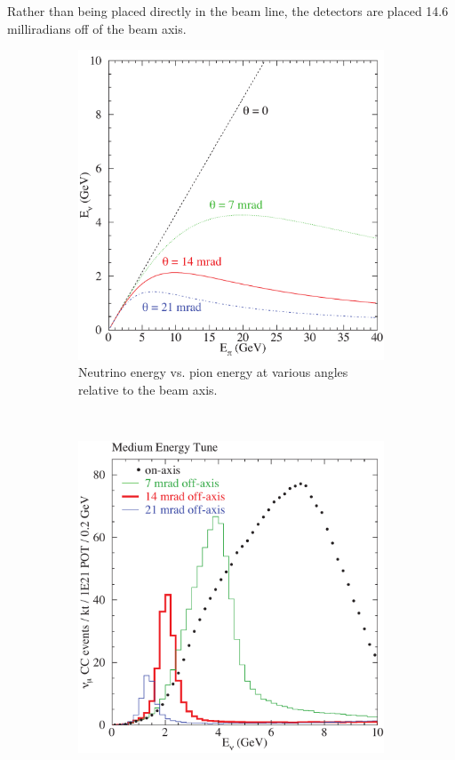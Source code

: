 Rather than being placed directly in the \numi beam line, the \nova detectors are placed 14.6 milliradians off of the beam axis.  
\begin{figure}[t]
\centering
\begin{subfigure}[c]{0.47\textwidth}
                \centering
                \includegraphics[width=\textwidth]{figures/plots/nova/EnuVsEpi.pdf}
                \caption{Neutrino energy vs. pion energy at various angles relative to the beam axis.}
                 \label{EnuEpi}
        \end{subfigure}
        ~
\begin{subfigure}[c]{0.47\textwidth}
                \centering
                \includegraphics[width=\textwidth]{figures/plots/nova/energySpectrum.pdf}

\end{subfigure}
\end{figure}
